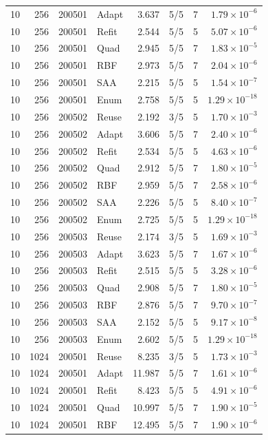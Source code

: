 \begin{longtable}{rrrlrrrr}
10 & 256 & 200501 & Adapt & 3.637 & 5/5 & 7 & $1.79\times10^{-6}$\\
10 & 256 & 200501 & Refit & 2.544 & 5/5 & 5 & $5.07\times10^{-6}$\\
10 & 256 & 200501 & Quad & 2.945 & 5/5 & 7 & $1.83\times10^{-5}$\\
10 & 256 & 200501 & RBF & 2.973 & 5/5 & 7 & $2.04\times10^{-6}$\\
10 & 256 & 200501 & SAA & 2.215 & 5/5 & 5 & $1.54\times10^{-7}$\\
10 & 256 & 200501 & Enum & 2.758 & 5/5 & 5 & $1.29\times10^{-18}$\\
10 & 256 & 200502 & Reuse & 2.192 & 3/5 & 5 & $1.70\times10^{-3}$\\
10 & 256 & 200502 & Adapt & 3.606 & 5/5 & 7 & $2.40\times10^{-6}$\\
10 & 256 & 200502 & Refit & 2.534 & 5/5 & 5 & $4.63\times10^{-6}$\\
10 & 256 & 200502 & Quad & 2.912 & 5/5 & 7 & $1.80\times10^{-5}$\\
10 & 256 & 200502 & RBF & 2.959 & 5/5 & 7 & $2.58\times10^{-6}$\\
10 & 256 & 200502 & SAA & 2.226 & 5/5 & 5 & $8.40\times10^{-7}$\\
10 & 256 & 200502 & Enum & 2.725 & 5/5 & 5 & $1.29\times10^{-18}$\\
10 & 256 & 200503 & Reuse & 2.174 & 3/5 & 5 & $1.69\times10^{-3}$\\
10 & 256 & 200503 & Adapt & 3.623 & 5/5 & 7 & $1.67\times10^{-6}$\\
10 & 256 & 200503 & Refit & 2.515 & 5/5 & 5 & $3.28\times10^{-6}$\\
10 & 256 & 200503 & Quad & 2.908 & 5/5 & 7 & $1.80\times10^{-5}$\\
10 & 256 & 200503 & RBF & 2.876 & 5/5 & 7 & $9.70\times10^{-7}$\\
10 & 256 & 200503 & SAA & 2.152 & 5/5 & 5 & $9.17\times10^{-8}$\\
10 & 256 & 200503 & Enum & 2.602 & 5/5 & 5 & $1.29\times10^{-18}$\\
10 & 1024 & 200501 & Reuse & 8.235 & 3/5 & 5 & $1.73\times10^{-3}$\\
10 & 1024 & 200501 & Adapt & 11.987 & 5/5 & 7 & $1.61\times10^{-6}$\\
10 & 1024 & 200501 & Refit & 8.423 & 5/5 & 5 & $4.91\times10^{-6}$\\
10 & 1024 & 200501 & Quad & 10.997 & 5/5 & 7 & $1.90\times10^{-5}$\\
10 & 1024 & 200501 & RBF & 12.495 & 5/5 & 7 & $1.90\times10^{-6}$\\

\end{longtable}
